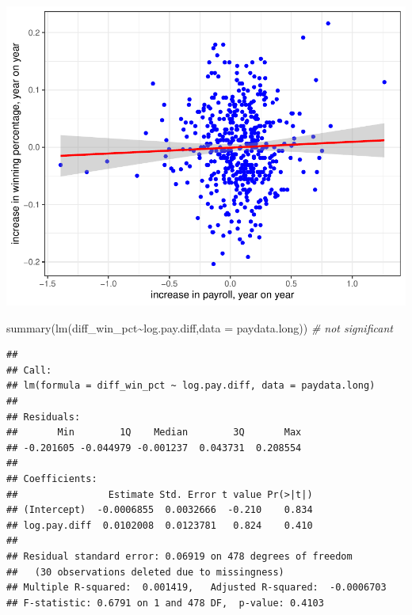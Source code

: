 \documentclass[
  12pt,
]{article}
\newenvironment{Shaded}{\begin{snugshade}}{\end{snugshade}}
\newcommand{\AttributeTok}[1]{\textcolor[rgb]{0.77,0.63,0.00}{#1}}
\newcommand{\CommentTok}[1]{\textcolor[rgb]{0.56,0.35,0.01}{\textit{#1}}}
\newcommand{\FunctionTok}[1]{\textcolor[rgb]{0.00,0.00,0.00}{#1}}
\newcommand{\NormalTok}[1]{#1}
\newcommand{\SpecialCharTok}[1]{\textcolor[rgb]{0.00,0.00,0.00}{#1}}
\begin{document}
\includegraphics{hw1_sol_files/figure-latex/unnamed-chunk-16-2.pdf}

\begin{Shaded}
\begin{Highlighting}[]
\FunctionTok{summary}\NormalTok{(}\FunctionTok{lm}\NormalTok{(diff\_win\_pct}\SpecialCharTok{\textasciitilde{}}\NormalTok{log.pay.diff,}\AttributeTok{data =}\NormalTok{ paydata.long)) }\CommentTok{\# not significant}
\end{Highlighting}
\end{Shaded}

\begin{verbatim}
## 
## Call:
## lm(formula = diff_win_pct ~ log.pay.diff, data = paydata.long)
## 
## Residuals:
##       Min        1Q    Median        3Q       Max 
## -0.201605 -0.044979 -0.001237  0.043731  0.208554 
## 
## Coefficients:
##                Estimate Std. Error t value Pr(>|t|)
## (Intercept)  -0.0006855  0.0032666  -0.210    0.834
## log.pay.diff  0.0102008  0.0123781   0.824    0.410
## 
## Residual standard error: 0.06919 on 478 degrees of freedom
##   (30 observations deleted due to missingness)
## Multiple R-squared:  0.001419,   Adjusted R-squared:  -0.0006703 
## F-statistic: 0.6791 on 1 and 478 DF,  p-value: 0.4103
\end{verbatim}
\end{document}
